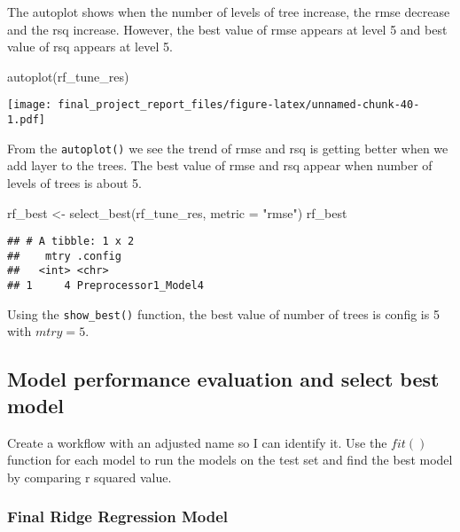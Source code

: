 \documentclass[
]{article}
\newenvironment{Shaded}{\begin{snugshade}}{\end{snugshade}}
\newcommand{\AttributeTok}[1]{\textcolor[rgb]{0.77,0.63,0.00}{#1}}
\newcommand{\FunctionTok}[1]{\textcolor[rgb]{0.00,0.00,0.00}{#1}}
\newcommand{\NormalTok}[1]{#1}
\newcommand{\OtherTok}[1]{\textcolor[rgb]{0.56,0.35,0.01}{#1}}
\newcommand{\StringTok}[1]{\textcolor[rgb]{0.31,0.60,0.02}{#1}}
\begin{document}
The autoplot shows when the number of levels of tree increase, the rmse
decrease and the rsq increase. However, the best value of rmse appears
at level 5 and best value of rsq appears at level 5.

\begin{Shaded}
\begin{Highlighting}[]
\FunctionTok{autoplot}\NormalTok{(rf\_tune\_res)}
\end{Highlighting}
\end{Shaded}

\texttt{[image: final\_project\_report\_files/figure-latex/unnamed-chunk-40-1.pdf]}

From the \texttt{autoplot()} we see the trend of rmse and rsq is getting
better when we add layer to the trees. The best value of rmse and rsq
appear when number of levels of trees is about 5.

\begin{Shaded}
\begin{Highlighting}[]
\NormalTok{rf\_best }\OtherTok{\textless{}{-}} \FunctionTok{select\_best}\NormalTok{(rf\_tune\_res, }\AttributeTok{metric =} \StringTok{"rmse"}\NormalTok{)}
\NormalTok{rf\_best}
\end{Highlighting}
\end{Shaded}

\begin{verbatim}
## # A tibble: 1 x 2
##    mtry .config             
##   <int> <chr>               
## 1     4 Preprocessor1_Model4
\end{verbatim}

Using the \texttt{show\_best()} function, the best value of number of
trees is config is 5 with \(mtry = 5\).

\hypertarget{model-performance-evaluation-and-select-best-model}{%
\subsection{Model performance evaluation and select best
model}\label{model-performance-evaluation-and-select-best-model}}

Create a workflow with an adjusted name so I can identify it. Use the
\(fit()\) function for each model to run the models on the test set and
find the best model by comparing r squared value.

\hypertarget{final-ridge-regression-model}{%
\subsubsection{Final Ridge Regression
Model}\label{final-ridge-regression-model}}
\end{document}
